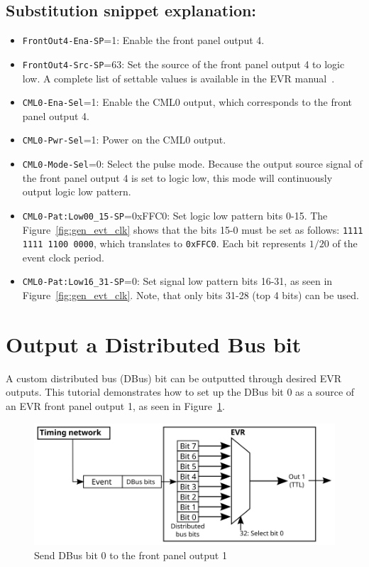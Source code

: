 \documentclass[12pt,a4paper]{article}
\begin{document}
\subsection{Substitution snippet explanation:}\label{sec:explain_cml}
\begin{itemize}
	\item \texttt{FrontOut4-Ena-SP}=1: Enable the front panel output 4.
	\item \texttt{FrontOut4-Src-SP}=63: Set the source of the front panel output 4 to logic low. A complete list of settable values is available in the EVR manual~\cite{evr_manual}.
	\item \texttt{CML0-Ena-Sel}=1: Enable the CML0 output, which corresponds to the front panel output 4.
	\item \texttt{CML0-Pwr-Sel}=1: Power on the CML0 output.
	\item \texttt{CML0-Mode-Sel}=0: Select the pulse mode. Because the output source signal of the front panel output 4 is set to logic low, this mode will continuously output logic low pattern.
	\item \texttt{CML0-Pat:Low00\_15-SP}=0xFFC0: Set logic low pattern bits 0-15. The Figure~\ref{fig:gen_evt_clk} shows that the bits 15-0 must be set as follows: \texttt{1111 1111 1100 0000}, which translates to \texttt{0xFFC0}. Each bit represents $1/20$ of the event clock period.
	\item \texttt{CML0-Pat:Low16\_31-SP}=0: Set signal low pattern bits 16-31, as seen in Figure~\ref{fig:gen_evt_clk}. Note, that only bits 31-28 (top 4 bits) can be used.
\end{itemize}


\section{Output a Distributed Bus bit}
A custom distributed bus (DBus) bit can be outputted through desired EVR outputs. This tutorial demonstrates how to set up the DBus bit 0 as a source of an EVR front panel output 1, as seen in Figure~\ref{fig:dbus}. 

\begin{figure}[H]
	\centering
	\includegraphics[]{./img/dbus}
	\caption{Send DBus bit 0 to the front panel output 1}
	\label{fig:dbus}
\end{figure}
\end{document}
